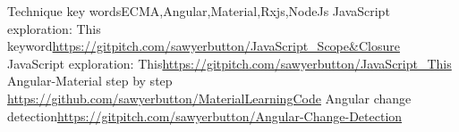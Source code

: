 \begin{cvskills}
  \cvskill
  {Technique key words}{ECMA,Angular,Material,Rxjs,NodeJs}
  \cvskill
  {JavaScript exploration: This keyword}{\href{https://gitpitch.com/sawyerbutton/JavaScript\_Scope\&Closure}{https://gitpitch.com/sawyerbutton/JavaScript\_Scope\&Closure}}
  \cvskill
  {JavaScript exploration: This}{\href{https://gitpitch.com/sawyerbutton/JavaScript\_This}{https://gitpitch.com/sawyerbutton/JavaScript\_This}}
  \cvskill
  {Angular-Material step by step }{\href{https://github.com/sawyerbutton/MaterialLearningCode}{https://github.com/sawyerbutton/MaterialLearningCode}}
  \cvskill
  {Angular change detection}{\href{https://gitpitch.com/sawyerbutton/Angular-Change-Detection}{https://gitpitch.com/sawyerbutton/Angular-Change-Detection}}
\end{cvskills}